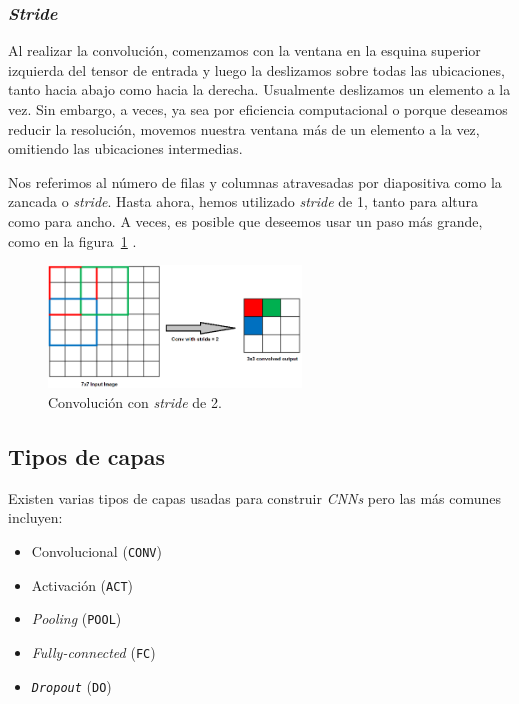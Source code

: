 \documentclass[a4paper,12pt]{article}
\begin{document}
\subsubsection{\textit{Stride}}

Al realizar la convolución, comenzamos con la ventana en la esquina superior izquierda del tensor de entrada y luego la deslizamos sobre todas las ubicaciones, tanto hacia abajo como hacia la derecha. Usualmente deslizamos un elemento a la vez. Sin embargo, a veces, ya sea por eficiencia computacional o porque deseamos reducir la resolución, movemos nuestra ventana más de un elemento a la vez, omitiendo las ubicaciones intermedias.

Nos referimos al número de filas y columnas atravesadas por diapositiva como la zancada o \textit{stride}. Hasta ahora, hemos utilizado \textit{stride} de 1, tanto para altura como para ancho. A veces, es posible que deseemos usar un paso más grande, como en la figura~\ref{fig:stride} \citep{Saha2020Oct}.

\begin{figure}[H]
	\begin{center}				
	\includegraphics[width=0.6\textwidth]{tesis_44.png}
  	\caption{Convolución con \textit{stride} de 2.}
  	\label{fig:stride}
  	\end{center}
\end{figure}

\subsection{Tipos de capas}
Existen varias tipos de capas usadas \citep{rosebrock2017deep} para construir \textit{CNNs} pero las más comunes incluyen:

\begin{itemize}
	\item Convolucional (\texttt{CONV})
	\item Activación (\texttt{ACT})
	\item \textit{Pooling} (\texttt{POOL})
	\item \textit{Fully-connected} (\texttt{FC})
	\item \texttt{\textit{Dropout}} (\texttt{DO})
\end{itemize}
\end{document}
